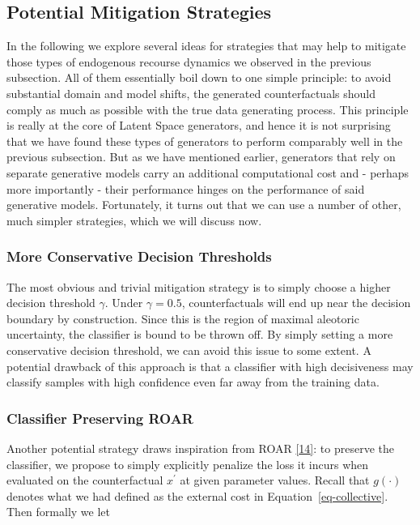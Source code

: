 \documentclass[
  conference]{IEEEtran}
\begin{document}
\hypertarget{sec-empirical-2-mitigate}{%
\subsection{Potential Mitigation
Strategies}\label{sec-empirical-2-mitigate}}

In the following we explore several ideas for strategies that may help
to mitigate those types of endogenous recourse dynamics we observed in
the previous subsection. All of them essentially boil down to one simple
principle: to avoid substantial domain and model shifts, the generated
counterfactuals should comply as much as possible with the true data
generating process. This principle is really at the core of Latent Space
generators, and hence it is not surprising that we have found these
types of generators to perform comparably well in the previous
subsection. But as we have mentioned earlier, generators that rely on
separate generative models carry an additional computational cost and -
perhaps more importantly - their performance hinges on the performance
of said generative models. Fortunately, it turns out that we can use a
number of other, much simpler strategies, which we will discuss now.

\hypertarget{more-conservative-decision-thresholds}{%
\subsubsection{More Conservative Decision
Thresholds}\label{more-conservative-decision-thresholds}}

The most obvious and trivial mitigation strategy is to simply choose a
higher decision threshold \(\gamma\). Under \(\gamma=0.5\),
counterfactuals will end up near the decision boundary by construction.
Since this is the region of maximal aleotoric uncertainty, the
classifier is bound to be thrown off. By simply setting a more
conservative decision threshold, we can avoid this issue to some extent.
A potential drawback of this approach is that a classifier with high
decisiveness may classify samples with high confidence even far away
from the training data.

\hypertarget{classifier-preserving-roar}{%
\subsubsection{Classifier Preserving
ROAR}\label{classifier-preserving-roar}}

Another potential strategy draws inspiration from ROAR
\protect\hyperlink{ref-upadhyay2021towards}{{[}14{]}}: to preserve the
classifier, we propose to simply explicitly penalize the loss it incurs
when evaluated on the counterfactual \(x^\prime\) at given parameter
values. Recall that \(g(\cdot)\) denotes what we had defined as the
external cost in Equation~\ref{eq-collective}. Then formally we let
\end{document}
